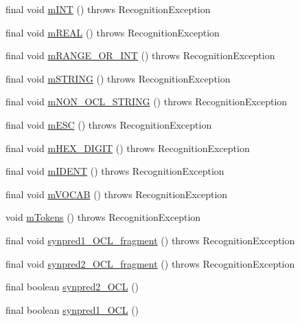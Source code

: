 \begin{DoxyCompactItemize}
\item 
final void \hyperlink{classorg_1_1tzi_1_1use_1_1parser_1_1ocl_1_1_o_c_l_lexer_a3766a3136573873adf2005e6a9bcf519}{m\-I\-N\-T} ()  throws Recognition\-Exception 
\item 
final void \hyperlink{classorg_1_1tzi_1_1use_1_1parser_1_1ocl_1_1_o_c_l_lexer_a2f3441a2af707eb9174083169cac0ce3}{m\-R\-E\-A\-L} ()  throws Recognition\-Exception 
\item 
final void \hyperlink{classorg_1_1tzi_1_1use_1_1parser_1_1ocl_1_1_o_c_l_lexer_a09b2c249ec6e895f7b362838598d2632}{m\-R\-A\-N\-G\-E\-\_\-\-O\-R\-\_\-\-I\-N\-T} ()  throws Recognition\-Exception 
\item 
final void \hyperlink{classorg_1_1tzi_1_1use_1_1parser_1_1ocl_1_1_o_c_l_lexer_a8b63497d956af3fddd2c17bb6e7810aa}{m\-S\-T\-R\-I\-N\-G} ()  throws Recognition\-Exception 
\item 
final void \hyperlink{classorg_1_1tzi_1_1use_1_1parser_1_1ocl_1_1_o_c_l_lexer_a416afdb7aeda67b36f6047e9fcf3ec91}{m\-N\-O\-N\-\_\-\-O\-C\-L\-\_\-\-S\-T\-R\-I\-N\-G} ()  throws Recognition\-Exception 
\item 
final void \hyperlink{classorg_1_1tzi_1_1use_1_1parser_1_1ocl_1_1_o_c_l_lexer_a0c5711568098a6371495c31f699ac5a1}{m\-E\-S\-C} ()  throws Recognition\-Exception 
\item 
final void \hyperlink{classorg_1_1tzi_1_1use_1_1parser_1_1ocl_1_1_o_c_l_lexer_a6cf2ab3a1ade53c0ce40019b21c7da2b}{m\-H\-E\-X\-\_\-\-D\-I\-G\-I\-T} ()  throws Recognition\-Exception 
\item 
final void \hyperlink{classorg_1_1tzi_1_1use_1_1parser_1_1ocl_1_1_o_c_l_lexer_a69d0de848084f599703b64b04d0d3080}{m\-I\-D\-E\-N\-T} ()  throws Recognition\-Exception 
\item 
final void \hyperlink{classorg_1_1tzi_1_1use_1_1parser_1_1ocl_1_1_o_c_l_lexer_aeab6e10994858345c18253f891d12f2f}{m\-V\-O\-C\-A\-B} ()  throws Recognition\-Exception 
\item 
void \hyperlink{classorg_1_1tzi_1_1use_1_1parser_1_1ocl_1_1_o_c_l_lexer_aa7680f05846df992ba08021f9a30d364}{m\-Tokens} ()  throws Recognition\-Exception 
\item 
final void \hyperlink{classorg_1_1tzi_1_1use_1_1parser_1_1ocl_1_1_o_c_l_lexer_a92d3c6b60a606ae2b7ba4da6da2ad99c}{synpred1\-\_\-\-O\-C\-L\-\_\-fragment} ()  throws Recognition\-Exception 
\item 
final void \hyperlink{classorg_1_1tzi_1_1use_1_1parser_1_1ocl_1_1_o_c_l_lexer_a1040e2e59c8d09e55344137533b196ed}{synpred2\-\_\-\-O\-C\-L\-\_\-fragment} ()  throws Recognition\-Exception 
\item 
final boolean \hyperlink{classorg_1_1tzi_1_1use_1_1parser_1_1ocl_1_1_o_c_l_lexer_adf8d0bba91884f1237901e9612c05af0}{synpred2\-\_\-\-O\-C\-L} ()
\item 
final boolean \hyperlink{classorg_1_1tzi_1_1use_1_1parser_1_1ocl_1_1_o_c_l_lexer_ace6d05619b9e4a727e27733a1bbe965d}{synpred1\-\_\-\-O\-C\-L} ()
\end{DoxyCompactItemize}
